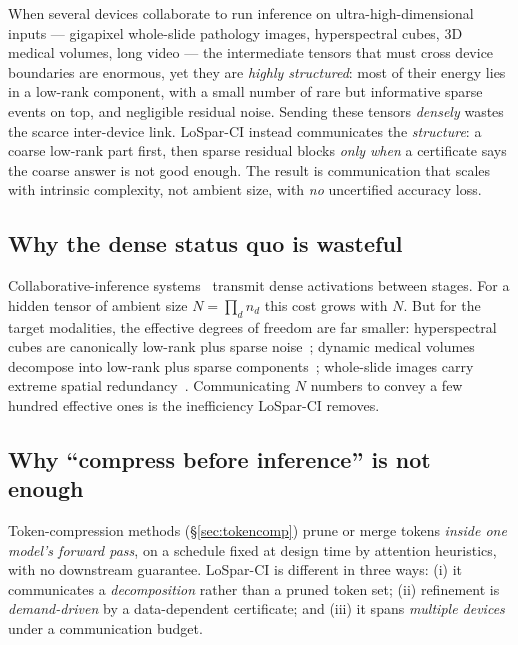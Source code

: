 \documentclass[11pt]{article}
\begin{document}
\begin{motivebox}
When several devices collaborate to run inference on ultra-high-dimensional inputs ---
gigapixel whole-slide pathology images, hyperspectral cubes, 3D medical volumes, long video
--- the intermediate tensors that must cross device boundaries are enormous, yet they are
\emph{highly structured}: most of their energy lies in a low-rank component, with a small
number of rare but informative sparse events on top, and negligible residual noise. Sending
these tensors \emph{densely} wastes the scarce inter-device link. LoSpar-CI instead
communicates the \emph{structure}: a coarse low-rank part first, then sparse residual blocks
\emph{only when} a certificate says the coarse answer is not good enough. The result is
communication that scales with intrinsic complexity, not ambient size, with \emph{no}
uncertified accuracy loss.
\end{motivebox}

\subsection{Why the dense status quo is wasteful}
Collaborative-inference systems~\cite{hexgen,jupiter,poster} transmit dense activations
between stages. For a hidden tensor of ambient size $N=\prod_d n_d$ this cost grows with $N$.
But for the target modalities, the effective degrees of freedom are far smaller: hyperspectral
cubes are canonically low-rank plus sparse noise~\cite{lrtv,hsi_lowrank}; dynamic medical
volumes decompose into low-rank plus sparse components~\cite{otazo}; whole-slide images carry
extreme spatial redundancy~\cite{wsi_natcomm}. Communicating $N$ numbers to convey a few
hundred effective ones is the inefficiency LoSpar-CI removes.

\subsection{Why ``compress before inference'' is not enough}
Token-compression methods (\S\ref{sec:tokencomp}) prune or merge tokens \emph{inside one
model's forward pass}, on a schedule fixed at design time by attention heuristics, with no
downstream guarantee. LoSpar-CI is different in three ways: (i) it communicates a
\emph{decomposition} rather than a pruned token set; (ii) refinement is \emph{demand-driven}
by a data-dependent certificate; and (iii) it spans \emph{multiple devices} under a
communication budget.

\end{document}
